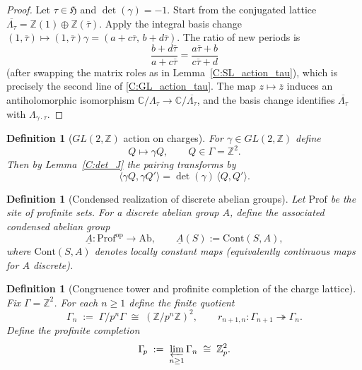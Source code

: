 \documentclass[11pt]{article}
\newtheorem{definition}[theorem]{Definition}
\theoremstyle{remark}
\begin{document}
\begin{proof}
Let $\tau\in\mathfrak H$ and $\det(\gamma)=-1$.
Start from the conjugated lattice $\overline{\Lambda_{\tau}}=\mathbb Z(1)\oplus \mathbb Z(\overline{\tau})$.
Apply the integral basis change $(1,\overline{\tau})\mapsto (1,\overline{\tau})\gamma=(a+c\overline{\tau},\,b+d\overline{\tau})$.
The ratio of new periods is
\begin{equation}
\frac{b+d\overline{\tau}}{a+c\overline{\tau}}=\frac{a\overline{\tau}+b}{c\overline{\tau}+d}
\end{equation}
(after swapping the matrix roles as in Lemma~\ref{C:SL_action_tau}), which is precisely the second line of \eqref{C:GL_action_tau}. The map $z\mapsto\overline{z}$ induces an antiholomorphic isomorphism $\mathbb C/\Lambda_{\tau}\to \mathbb C/\overline{\Lambda_{\tau}}$, and the basis change identifies $\overline{\Lambda_{\tau}}$ with $\Lambda_{\gamma\cdot\tau}$.
\end{proof}

\begin{definition}[$GL(2,\mathbb Z)$ action on charges]
For $\gamma\in GL(2,\mathbb Z)$ define
\begin{equation}
Q\longmapsto \gamma Q,\qquad Q\in\Gamma=\mathbb Z^{2}.
\label{C:GL_action_charge}
\end{equation}
Then by Lemma~\ref{C:det_J} the pairing transforms by
\begin{equation}
\langle \gamma Q,\gamma Q'\rangle = \det(\gamma)\,\langle Q,Q'\rangle.
\label{C:pair_det}
\end{equation}
\end{definition}

\begin{definition}[Condensed realization of discrete abelian groups]
Let $\mathrm{Prof}$ be the site of profinite sets.
For a discrete abelian group $A$, define the associated condensed abelian group
\begin{equation}
\underline{A}:\mathrm{Prof}^{\mathrm{op}}\to \mathrm{Ab},
\qquad
\underline{A}(S):=\mathrm{Cont}(S,A),
\label{C:underlineA}
\end{equation}
where $\mathrm{Cont}(S,A)$ denotes locally constant maps (equivalently continuous maps for $A$ discrete).
\end{definition}

\begin{definition}[Congruence tower and profinite completion of the charge lattice]
Fix $\Gamma=\mathbb Z^{2}$.
For each $n\ge 1$ define the finite quotient
\begin{equation}
\Gamma_{n}\;:=\;\Gamma/p^{n}\Gamma\;\cong\;(\mathbb Z/p^{n}\mathbb Z)^{2},
\qquad
r_{n+1,n}:\Gamma_{n+1}\twoheadrightarrow \Gamma_{n}.
\label{C:Gamma_n}
\end{equation}
Define the profinite completion
\begin{equation}
\Gamma_{\!p}\;:=\;\varprojlim_{n\ge 1}\Gamma_{n}\;\cong\;\mathbb Z_{p}^{2}.
\label{C:Gamma_p}
\end{equation}
\end{definition}
\end{document}
